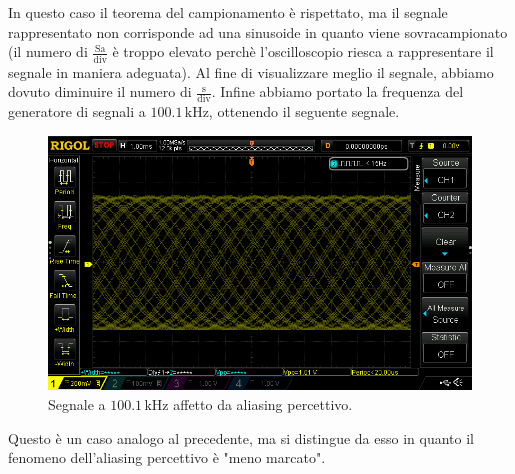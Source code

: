 \documentclass[a4paper]{article}
\begin{document}
				\newline
				In questo caso il teorema del campionamento è rispettato, ma il segnale rappresentato non corrisponde ad una sinusoide in quanto viene sovracampionato (il numero di $ \mathrm{\frac{Sa}{div}} $ è troppo elevato perchè l'oscilloscopio riesca a rappresentare il segnale in maniera adeguata). Al fine di visualizzare meglio il segnale, abbiamo dovuto diminuire il numero di $ \mathrm{\frac{s}{div}} $.
				\newline
				Infine abbiamo portato la frequenza del generatore di segnali a $ 100.1 \, \mathrm{kHz} $, ottenendo il seguente segnale.
				\begin{figure}[h!]
					\centering
					\includegraphics[scale=0.4]{aliasingPercettivo100kHz}
					\caption{Segnale a $ 100.1 \, \mathrm{kHz} $ affetto da aliasing percettivo.}
					\label{fig:aliasingPercettivo100kHz}
				\end{figure}
				\newpage
				Questo è un caso analogo al precedente, ma si distingue da esso in quanto il fenomeno dell'aliasing percettivo è "meno marcato".
\end{document}
